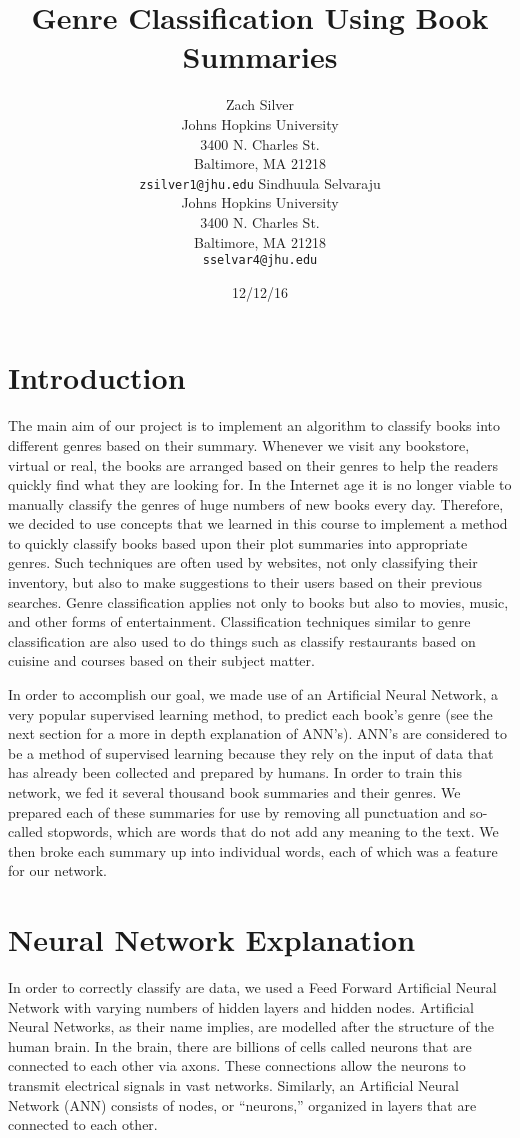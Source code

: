 \documentclass[11pt,letterpaper]{article}
\title{Genre Classification Using Book Summaries}
\author{Zach Silver\\
  Johns Hopkins University\\
  3400 N. Charles St.\\
  Baltimore, MA 21218\\
  {\tt zsilver1@jhu.edu}
  \And
  Sindhuula Selvaraju \\
  Johns Hopkins University\\
  3400 N. Charles St.\\
  Baltimore, MA 21218\\
  {\tt sselvar4@jhu.edu}}
\date{12/12/16}
\begin{document}
\raggedbottom
\maketitle

\section{Introduction}

The main aim of our project is to implement an algorithm to classify books into different genres based on their summary. Whenever we visit any bookstore, virtual or real, the books are arranged based on their genres to help the readers quickly find what they are looking for. In the Internet age it is no longer viable to manually classify the genres of huge numbers of new books every day. Therefore, we decided to use concepts that we learned in this course to implement a method to quickly classify books based upon their plot summaries into appropriate genres. Such techniques are often used by websites, not only classifying their inventory, but also to make suggestions to their users based on their previous searches. Genre classification applies not only to books but also to movies, music, and other forms of entertainment. Classification techniques similar to genre classification are also used to do things such as classify restaurants based on cuisine and courses based on their subject matter.

In order to accomplish our goal, we made use of an Artificial Neural Network, a very popular supervised learning method, to predict each book's genre (see the next section for a more in depth explanation of ANN’s). ANN's are considered to be a method of supervised learning because they rely on the input of data that has already been collected and prepared by humans. In order to train this network, we fed it several thousand book summaries and their genres. We prepared each of these summaries for use by removing all punctuation and so-called stopwords, which are words that do not add any meaning to the text. We then broke each summary up into individual words, each of which was a feature for our network.


\section{Neural Network Explanation}

In order to correctly classify are data, we used a Feed Forward Artificial Neural Network with varying numbers of hidden layers and hidden nodes. Artificial Neural Networks, as their name implies, are modelled after the structure of the human brain. In the brain, there are billions of cells called neurons that are connected to each other via axons. These connections allow the neurons to transmit electrical signals in vast networks. Similarly, an Artificial Neural Network (ANN) consists of nodes, or “neurons,” organized in layers that are connected to each other.
\end{document}
